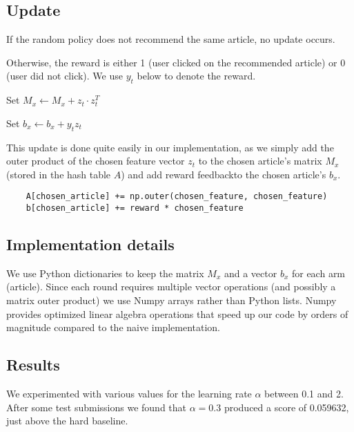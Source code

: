 \documentclass[a4paper, 11pt]{article}
\begin{document}
\subsection{Update}

If the random policy does not recommend the same article, no update occurs.

Otherwise, the reward is either 1 (user clicked on the recommended article) or 0 (user did not click). We use $y_t$ below to denote the reward.



Set $M_x \leftarrow M_x + z_t \cdot z_t^T$

Set $b_x \leftarrow b_x + y_t z_t$

This update is done quite easily in our implementation, as we simply add the outer product of the chosen feature vector $z_t$ to the chosen article's matrix $M_x$ (stored in the hash table $A$) and add reward feedbackto the chosen article's $b_x$.
\begin{verbatim}
    A[chosen_article] += np.outer(chosen_feature, chosen_feature)
    b[chosen_article] += reward * chosen_feature
\end{verbatim}

\subsection{Implementation details}

We use Python dictionaries to keep the matrix $M_x$ and a vector $b_x$ for each arm (article). Since each round requires multiple vector operations (and possibly a matrix outer product) we use Numpy arrays rather than Python lists. Numpy provides optimized linear algebra operations that speed up our code by orders of magnitude compared to the naive implementation.

\subsection{Results}

We experimented with various values for the learning rate $\alpha$ between 0.1 and 2. After some test submissions we found that $\alpha = 0.3$ produced a score of 0.059632, just above the hard baseline.
\end{document}
